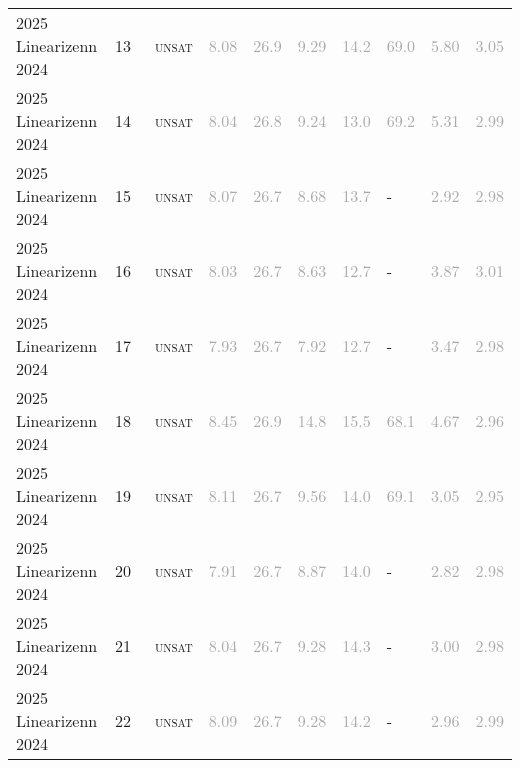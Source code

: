 \begin{center}
{\begin{longtable}{@{}llllllllll@{}}
2025 Linearizenn 2024 & 13 & ~\textsc{unsat} & \textcolor{darkgray}{8.08} & \textcolor{darkgray}{26.9} & \textcolor{darkgray}{9.29} & \textcolor{darkgray}{14.2} & \textcolor{darkgray}{69.0} & \textcolor{darkgray}{5.80} & \textcolor{darkgray}{3.05} \\
2025 Linearizenn 2024 & 14 & ~\textsc{unsat} & \textcolor{darkgray}{8.04} & \textcolor{darkgray}{26.8} & \textcolor{darkgray}{9.24} & \textcolor{darkgray}{13.0} & \textcolor{darkgray}{69.2} & \textcolor{darkgray}{5.31} & \textcolor{darkgray}{2.99} \\
2025 Linearizenn 2024 & 15 & ~\textsc{unsat} & \textcolor{darkgray}{8.07} & \textcolor{darkgray}{26.7} & \textcolor{darkgray}{8.68} & \textcolor{darkgray}{13.7} & - & \textcolor{darkgray}{2.92} & \textcolor{darkgray}{2.98} \\
2025 Linearizenn 2024 & 16 & ~\textsc{unsat} & \textcolor{darkgray}{8.03} & \textcolor{darkgray}{26.7} & \textcolor{darkgray}{8.63} & \textcolor{darkgray}{12.7} & - & \textcolor{darkgray}{3.87} & \textcolor{darkgray}{3.01} \\
2025 Linearizenn 2024 & 17 & ~\textsc{unsat} & \textcolor{darkgray}{7.93} & \textcolor{darkgray}{26.7} & \textcolor{darkgray}{7.92} & \textcolor{darkgray}{12.7} & - & \textcolor{darkgray}{3.47} & \textcolor{darkgray}{2.98} \\
2025 Linearizenn 2024 & 18 & ~\textsc{unsat} & \textcolor{darkgray}{8.45} & \textcolor{darkgray}{26.9} & \textcolor{darkgray}{14.8} & \textcolor{darkgray}{15.5} & \textcolor{darkgray}{68.1} & \textcolor{darkgray}{4.67} & \textcolor{darkgray}{2.96} \\
2025 Linearizenn 2024 & 19 & ~\textsc{unsat} & \textcolor{darkgray}{8.11} & \textcolor{darkgray}{26.7} & \textcolor{darkgray}{9.56} & \textcolor{darkgray}{14.0} & \textcolor{darkgray}{69.1} & \textcolor{darkgray}{3.05} & \textcolor{darkgray}{2.95} \\
2025 Linearizenn 2024 & 20 & ~\textsc{unsat} & \textcolor{darkgray}{7.91} & \textcolor{darkgray}{26.7} & \textcolor{darkgray}{8.87} & \textcolor{darkgray}{14.0} & - & \textcolor{darkgray}{2.82} & \textcolor{darkgray}{2.98} \\
2025 Linearizenn 2024 & 21 & ~\textsc{unsat} & \textcolor{darkgray}{8.04} & \textcolor{darkgray}{26.7} & \textcolor{darkgray}{9.28} & \textcolor{darkgray}{14.3} & - & \textcolor{darkgray}{3.00} & \textcolor{darkgray}{2.98} \\
2025 Linearizenn 2024 & 22 & ~\textsc{unsat} & \textcolor{darkgray}{8.09} & \textcolor{darkgray}{26.7} & \textcolor{darkgray}{9.28} & \textcolor{darkgray}{14.2} & - & \textcolor{darkgray}{2.96} & \textcolor{darkgray}{2.99} \\

\end{longtable}}
\end{center}
